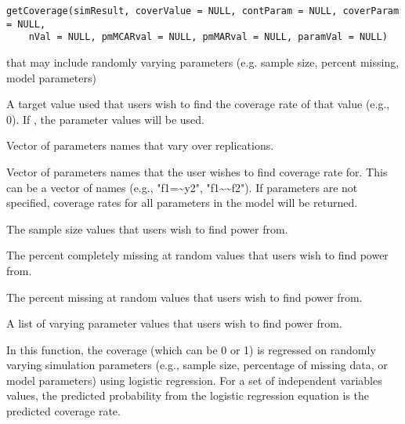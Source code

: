 \documentclass[a4paper]{book}
\begin{document}
%
\begin{Usage}
\begin{verbatim}
getCoverage(simResult, coverValue = NULL, contParam = NULL, coverParam = NULL, 
    nVal = NULL, pmMCARval = NULL, pmMARval = NULL, paramVal = NULL)
\end{verbatim}
\end{Usage}
%
\begin{Arguments}
\begin{ldescription}
\item[\code{simResult}] 
 that may include randomly varying parameters (e.g. sample size, percent missing, model parameters)

\item[\code{coverValue}] 
A target value used that users wish to find the coverage rate of that value (e.g., 0). If , the parameter values will be used.

\item[\code{contParam}] 
Vector of parameters names that vary over replications.

\item[\code{coverParam}] 
Vector of parameters names that the user wishes to find coverage rate for. This can be a vector of names (e.g., "f1=\textasciitilde{}y2", "f1\textasciitilde{}\textasciitilde{}f2"). If parameters are not specified, coverage rates for all parameters in the model will be returned.

\item[\code{nVal}] 
The sample size values that users wish to find power from.

\item[\code{pmMCARval}] 
The percent completely missing at random values that users wish to find power from.

\item[\code{pmMARval}] 
The percent missing at random values that users wish to find power from.

\item[\code{paramVal}] 
A list of varying parameter values that users wish to find power from.

\end{ldescription}
\end{Arguments}
%
\begin{Details}\relax
In this function, the coverage (which can be 0 or 1) is regressed on randomly varying simulation parameters (e.g., sample size, percentage of missing data, or model parameters) using logistic regression. For a set of independent variables values, the predicted probability from the logistic regression equation is the predicted coverage rate.
\end{Details}
\end{document}
